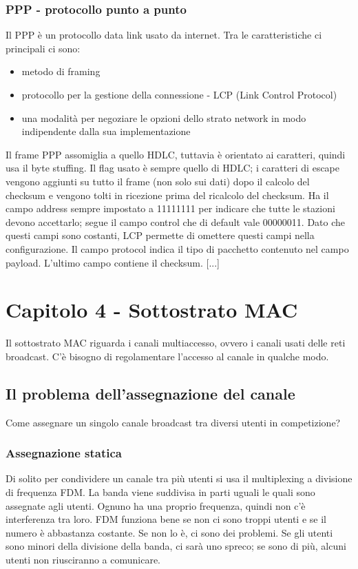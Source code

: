 \subsubsection{PPP - protocollo punto a punto}
Il PPP è un protocollo data link usato da internet.
Tra le caratteristiche ci principali ci sono:
\begin{itemize}
    \item metodo di framing
    \item protocollo per la gestione della connessione - LCP (Link Control Protocol)
    \item una modalità per negoziare le opzioni dello strato network in modo indipendente dalla sua implementazione
\end{itemize}

Il frame PPP assomiglia a quello HDLC, tuttavia è orientato ai caratteri, quindi usa il byte stuffing.
Il flag usato è sempre quello di HDLC; i caratteri di escape vengono aggiunti su tutto il frame (non solo sui dati)
dopo il calcolo del checksum e vengono tolti in ricezione prima del ricalcolo del checksum.
Ha il campo address sempre impostato a 11111111 per indicare che tutte le stazioni devono accettarlo;
segue il campo control che di default vale 00000011.
Dato che questi campi sono costanti, LCP permette di omettere questi campi nella configurazione.
Il campo protocol indica il tipo di pacchetto contenuto nel campo payload.
L'ultimo campo contiene il checksum.
[...]

\newpage
\section{Capitolo 4 - Sottostrato MAC}
Il sottostrato MAC riguarda i canali multiaccesso, ovvero i canali usati delle reti broadcast.
C'è bisogno di regolamentare l'accesso al canale in qualche modo.

\subsection{Il problema dell'assegnazione del canale} %
Come assegnare un singolo canale broadcast tra diversi utenti in competizione?

\subsubsection{Assegnazione statica}
Di solito per condividere un canale tra più utenti si usa il multiplexing a divisione di frequenza FDM.
La banda viene suddivisa in parti uguali le quali sono assegnate agli utenti. 
Ognuno ha una proprio frequenza, quindi non c'è interferenza tra loro.
FDM funziona bene se non ci sono troppi utenti e se il numero è abbastanza costante.
Se non lo è, ci sono dei problemi. 
Se gli utenti sono minori della divisione della banda, ci sarà uno spreco;
se sono di più, alcuni utenti non riusciranno a comunicare.

